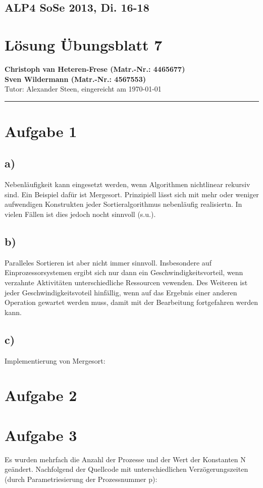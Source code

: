 \documentclass[11pt,a4paper,DIV=10,]{scrartcl}
\begin{document}
\subsection*{ALP4 SoSe 2013, Di. 16-18}
\section*{Lösung Übungsblatt 7}
\textbf{Christoph van Heteren-Frese (Matr.-Nr.: 4465677)} \\ \textbf{Sven Wildermann (Matr.-Nr.: 4567553)}\\
Tutor: Alexander Steen, eingereicht am \today\\
\hrule
\section*{Aufgabe 1}
\subsection*{a)}
Nebenläufigkeit kann eingesetzt werden, wenn Algorithmen nichtlinear rekursiv sind. Ein Beispiel dafür ist Mergesort. Prinzipiell lässt sich mit mehr oder weniger aufwendigen Konstrukten jeder Sortieralgorithmus nebenläufig realisiertn. In vielen Fällen ist dies jedoch nocht sinnvoll (s.u.).
\subsection*{b)}
Paralleles Sortieren ist aber nicht immer sinnvoll. Insbesondere auf Einprozessorsystemen ergibt sich nur dann ein Geschwindigkeitsvorteil, wenn verzahnte Aktivitäten unterschiedliche Ressourcen vewenden. Des Weiteren ist jeder Geschwindigkeitsvoteil hinfällig, wenn auf das Ergebnis einer anderen Operation gewartet werden muss, damit mit der Bearbeitung fortgefahren werden kann.
\subsection*{c)} 
Implementierung von Mergesort:

\section*{Aufgabe 2}
 
\section*{Aufgabe 3}
Es wurden mehrfach die Anzahl der Prozesse und der Wert der Konstanten N geändert. Nachfolgend der Quellcode mit unterschiedlichen Verzögerungszeiten (durch Parametriesierung der Prozessnummer p):
 
\end{document}
